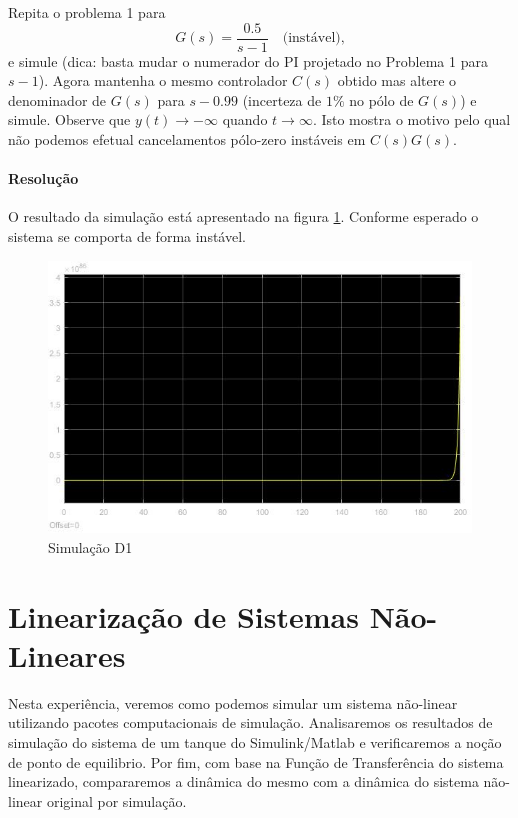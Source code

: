\documentclass[
]{book}
\theoremstyle{definition}
\theoremstyle{definition}
\theoremstyle{definition}
\theoremstyle{remark}
\begin{document}
Repita o problema 1 para
\[
G(s) = \frac{0.5}{s-1} \quad \text{(instável),}
\]
e simule (dica: basta mudar o numerador do PI projetado no Problema 1 para \(s-1\)). Agora mantenha o mesmo controlador \(C(s)\) obtido mas altere o denominador de \(G(s)\) para \(s-0.99\) (incerteza de \(1\%\) no pólo de \(G(s)\)) e simule. Observe que \(y(t) \to -\infty\) quando \(t\to\infty\). Isto mostra o motivo pelo qual não podemos efetual cancelamentos pólo-zero instáveis em \(C(s)G(s)\).

\hypertarget{resoluuxe7uxe3o-3}{%
\subsubsection*{Resolução}\label{resoluuxe7uxe3o-3}}

O resultado da simulação está apresentado na figura \ref{fig:prob4A1}. Conforme esperado o sistema se comporta de forma instável.

\begin{figure}

{\centering \includegraphics[width=0.8\linewidth]{Imagens/Lab5/Resolução/prob4A1} 

}

\caption{Simulação D1}\label{fig:prob4A1}
\end{figure}

\hypertarget{lab6}{%
\chapter{Linearização de Sistemas Não-Lineares}\label{lab6}}

Nesta experiência, veremos como podemos simular um sistema não-linear utilizando pacotes computacionais de simulação. Analisaremos os resultados de simulação do sistema de um tanque do Simulink/Matlab e verificaremos a noção de ponto de equilibrio. Por fim, com base na Função de Transferência do sistema linearizado, compararemos a dinâmica do mesmo com a dinâmica do sistema não-linear original por simulação.
\end{document}
